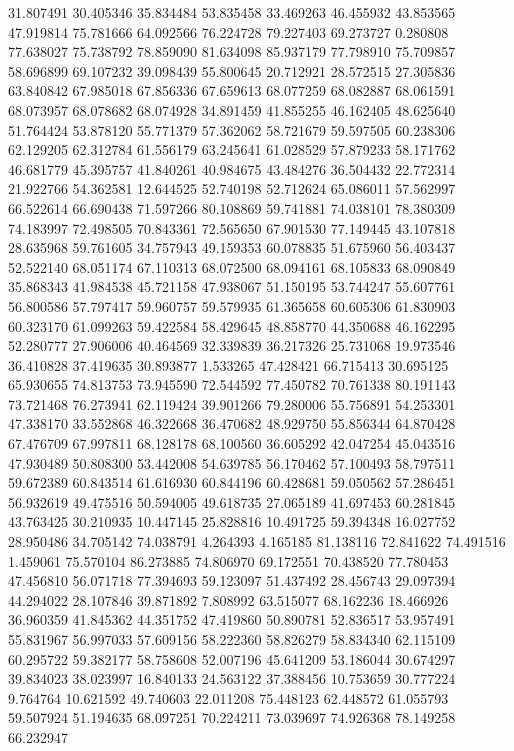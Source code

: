 31.807491
30.405346
35.834484
53.835458
33.469263
46.455932
43.853565
47.919814
75.781666
64.092566
76.224728
79.227403
69.273727
0.280808
77.638027
75.738792
78.859090
81.634098
85.937179
77.798910
75.709857
58.696899
69.107232
39.098439
55.800645
20.712921
28.572515
27.305836
63.840842
67.985018
67.856336
67.659613
68.077259
68.082887
68.061591
68.073957
68.078682
68.074928
34.891459
41.855255
46.162405
48.625640
51.764424
53.878120
55.771379
57.362062
58.721679
59.597505
60.238306
62.129205
62.312784
61.556179
63.245641
61.028529
57.879233
58.171762
46.681779
45.395757
41.840261
40.984675
43.484276
36.504432
22.772314
21.922766
54.362581
12.644525
52.740198
52.712624
65.086011
57.562997
66.522614
66.690438
71.597266
80.108869
59.741881
74.038101
78.380309
74.183997
72.498505
70.843361
72.565650
67.901530
77.149445
43.107818
28.635968
59.761605
34.757943
49.159353
60.078835
51.675960
56.403437
52.522140
68.051174
67.110313
68.072500
68.094161
68.105833
68.090849
35.868343
41.984538
45.721158
47.938067
51.150195
53.744247
55.607761
56.800586
57.797417
59.960757
59.579935
61.365658
60.605306
61.830903
60.323170
61.099263
59.422584
58.429645
48.858770
44.350688
46.162295
52.280777
27.906006
40.464569
32.339839
36.217326
25.731068
19.973546
36.410828
37.419635
30.893877
1.533265
47.428421
66.715413
30.695125
65.930655
74.813753
73.945590
72.544592
77.450782
70.761338
80.191143
73.721468
76.273941
62.119424
39.901266
79.280006
55.756891
54.253301
47.338170
33.552868
46.322668
36.470682
48.929750
55.856344
64.870428
67.476709
67.997811
68.128178
68.100560
36.605292
42.047254
45.043516
47.930489
50.808300
53.442008
54.639785
56.170462
57.100493
58.797511
59.672389
60.843514
61.616930
60.844196
60.428681
59.050562
57.286451
56.932619
49.475516
50.594005
49.618735
27.065189
41.697453
60.281845
43.763425
30.210935
10.447145
25.828816
10.491725
59.394348
16.027752
28.950486
34.705142
74.038791
4.264393
4.165185
81.138116
72.841622
74.491516
1.459061
75.570104
86.273885
74.806970
69.172551
70.438520
77.780453
47.456810
56.071718
77.394693
59.123097
51.437492
28.456743
29.097394
44.294022
28.107846
39.871892
7.808992
63.515077
68.162236
18.466926
36.960359
41.845362
44.351752
47.419860
50.890781
52.836517
53.957491
55.831967
56.997033
57.609156
58.222360
58.826279
58.834340
62.115109
60.295722
59.382177
58.758608
52.007196
45.641209
53.186044
30.674297
39.834023
38.023997
16.840133
24.563122
37.388456
10.753659
30.777224
9.764764
10.621592
49.740603
22.011208
75.448123
62.448572
61.055793
59.507924
51.194635
68.097251
70.224211
73.039697
74.926368
78.149258
66.232947
